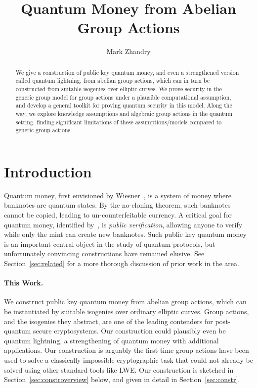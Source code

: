\documentclass{article}\usepackage[a4paper,margin=20mm]{geometry}
\title{Quantum Money from Abelian Group Actions}
\author{Mark Zhandry}\date{}
\numberwithin{theorem}{section}
\numberwithin{equation}{section}
\begin{document}
\maketitle

\begin{abstract}We give a construction of public key quantum money, and even a strengthened version called quantum lightning, from abelian group actions, which can in turn be constructed from suitable isogenies over elliptic curves. We prove security in the generic group model for group actions under a plausible computational assumption, and develop a general toolkit for proving quantum security in this model. Along the way, we explore knowledge assumptions and algebraic group actions in the quantum setting, finding significant limitations of these assumptions/models compared to generic group actions. 
\end{abstract}
	


\section{Introduction}\label{sec:intro}

Quantum money, first envisioned by Wiesner~\cite{Wiesner83}, is a system of money where banknotes are quantum states. By the no-cloning theorem, such banknotes cannot be copied, leading to un-counterfeitable currency. A critical goal for quantum money, identified by~\cite{CCC:Aaronson09}, is \emph{public verification}, allowing anyone to verify while only the mint can create new banknotes. Such public key quantum money is an important central object in the study of quantum protocols, but unfortunately convincing constructions have remained elusive. See Section~\ref{sec:related} for a more thorough discussion of prior work in the area.

\paragraph{This Work.} We construct public key quantum money from abelian group actions, which can be instantiated by suitable isogenies over ordinary elliptic curves. Group actions, and the isogenies they abstract, are one of the leading contenders for post-quantum secure cryptosystems. Our construction could plausibly even be quantum lightning, a strengthening of quantum money with additional applications. Our construction is arguably the first time group actions have been used to solve a classically-impossible cryptographic task that could not already be solved using other standard tools like LWE. Our construction is sketched in Section~\ref{sec:constroverview} below, and given in detail in Section~\ref{sec:constr}.
\end{document}

